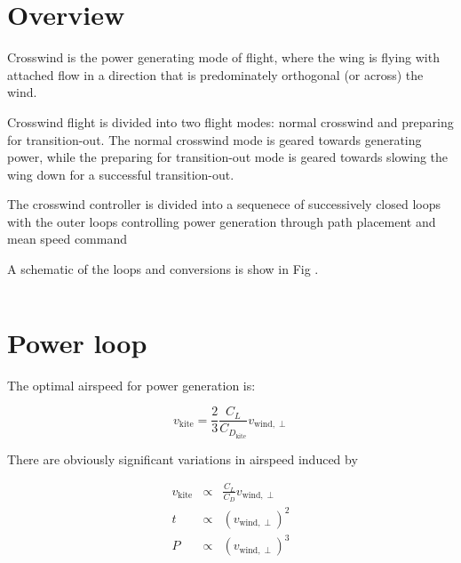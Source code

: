 \documentclass[11pt]{amsart}
\newcommand{\wind}{\mathrm{wind}}
\newcommand{\kite}{\mathrm{kite}}
\begin{document}
\section{Overview}

Crosswind is the power generating mode of flight, where the wing is
flying with attached flow in a direction that is predominately
orthogonal (or across) the wind.

Crosswind flight is divided into two flight modes: normal crosswind
and preparing for transition-out.  The normal crosswind mode is geared
towards generating power, while the preparing for transition-out mode
is geared towards slowing the wing down for a successful
transition-out.


The crosswind controller is divided into a sequenece of successively
closed loops with the outer loops controlling power generation through
path placement and mean speed command

A schematic of the loops and conversions is show in Fig .


\begin{equation}
\end{equation}

\section{Power loop}

The optimal airspeed for power generation is:

\begin{equation}
  v_{\kite} = \frac{2}{3} \frac{C_L}{C_{D_{\kite}}} v_{\wind,\perp}
\end{equation}

There are obviously significant variations in airspeed induced by 


\begin{eqnarray}
  v_{\kite} &\propto& \frac{C_L}{C_D} v_{\wind, \perp} \\
  t &\propto& (v_{\wind, \perp})^2 \\
  P &\propto& (v_{\wind, \perp})^3 \\
\end{eqnarray}
\end{document}
